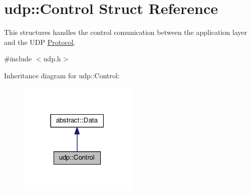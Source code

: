 \hypertarget{structudp_1_1Control}{}\section{udp\+:\+:Control Struct Reference}
\label{structudp_1_1Control}


This structures handles the control comunication between the application layer and the U\+DP \hyperlink{classProtocol}{Protocol}.  




{\ttfamily \#include $<$udp.\+h$>$}



Inheritance diagram for udp\+:\+:Control\+:\nopagebreak
\begin{figure}[H]
\begin{center}
\leavevmode
\includegraphics[width=159pt]{structudp_1_1Control__inherit__graph}
\end{center}
\end{figure}



